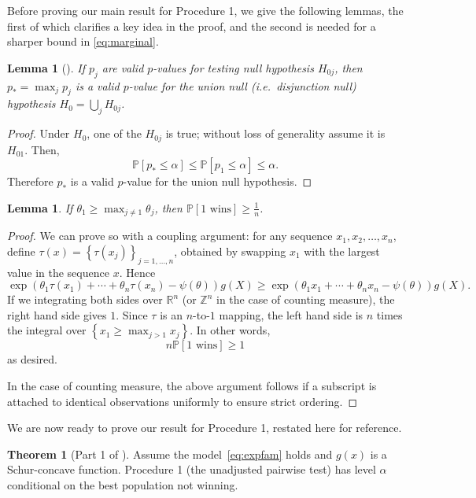\documentclass[aos, authoryear]{imsart}
\newtheorem{lemma}[corollary]{Lemma}
\theoremstyle{definition}
\theoremstyle{custom}
\newtheorem*{customthm}{Theorem}
\newcommand{\PP}{\mathbb{P}}
\begin{document}
Before proving our main result for Procedure 1, we give the following lemmas, the first of which clarifies a key idea in the proof, and the second is needed for a sharper bound in \eqref{eq:marginal}.

\begin{lemma}[\citealp{Berger:1982hy}]
\label{lma:union}
If $p_j$ are valid $p$-values for testing null hypothesis $H_{0j}$, then $p_* = \max_j p_j$ is a valid $p$-value for the union null (i.e.\ disjunction null) hypothesis $H_0 = \bigcup_j H_{0j}$.
\end{lemma}

\begin{proof}
Under $H_0$, one of the $H_{0j}$ is true; without loss of generality assume it is $H_{01}$. Then,
\[\PP\left[p_* \le \alpha\right] \le \PP\left[p_1 \le \alpha\right] \le \alpha.\]
Therefore $p_*$ is a valid $p$-value for the union null hypothesis.
\end{proof}

\begin{lemma}
\label{lma:margsharp}
If $\theta_1 \ge \max_{j \ne 1} \theta_j$, then $\PP\left[1 \text{ wins}\right] \ge \frac{1}{n}$.
\end{lemma}

\begin{proof}
We can prove so with a coupling argument: for any sequence $x_1, x_2, \ldots, x_n$, define $\tau\left(x\right) = \left\{\tau\left(x_j\right)\right\}_{j = 1, \ldots, n}$, obtained by swapping $x_1$ with the largest value in the sequence $x$. Hence
\[\exp\left(\theta_1 \tau\left(x_1\right) + \cdots + \theta_n \tau\left(x_n\right) - \psi\left(\theta\right)\right) g\left(X\right) \ge \exp\left(\theta_1 x_1 + \cdots + \theta_n x_n - \psi\left(\theta\right)\right) g\left(X\right).\]
If we integrating both sides over $\mathbb{R}^n$ (or $\mathbb{Z}^n$ in the case of counting measure), the right hand side gives $1$. Since $\tau$ is an $n$-to-$1$ mapping, the left hand side is $n$ times the integral over $\left\{x_1 \ge \max_{j > 1} x_j\right\}$. In other words,
\[n \PP\left[1 \text{ wins}\right] \ge 1\]
as desired.

In the case of counting measure, the above argument follows if a subscript is attached to identical observations uniformly to ensure strict ordering.
\end{proof}

We are now ready to prove our result for Procedure 1, restated here for reference.

\begin{customthm}[Part 1 of ]
Assume the model~\eqref{eq:expfam} holds and $g\left(x\right)$ is a Schur-concave function. Procedure 1 (the unadjusted pairwise test) has level $\alpha$ conditional on the best population not winning.
\end{customthm}
\end{document}

